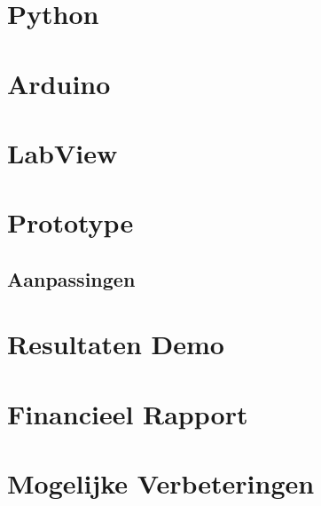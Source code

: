 \documentclass[kulak]{kulakarticle} %
\begin{document}
\section{Python}


\section{Arduino}


\section{LabView}



\section{Prototype}


\subsection{Aanpassingen}


\section{Resultaten Demo}





\section{Financieel Rapport}





\section{Mogelijke Verbeteringen}





\end{document}
